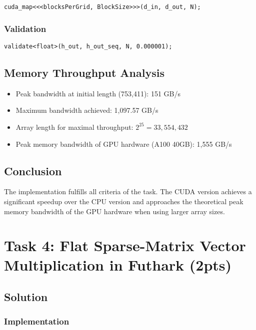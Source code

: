\documentclass{article}
\begin{document}
\begin{lstlisting}[language=cuda]
cuda_map<<<blocksPerGrid, BlockSize>>>(d_in, d_out, N);
\end{lstlisting}

\subsubsection{Validation}

\begin{lstlisting}[language=cuda]
validate<float>(h_out, h_out_seq, N, 0.000001);
\end{lstlisting}

\subsection{Memory Throughput Analysis}

\begin{itemize}
    \item Peak bandwidth at initial length (753,411): 151 GB/s
    \item Maximum bandwidth achieved: 1,097.57 GB/s
    \item Array length for maximal throughput: $2^{25} = 33,554,432$
    \item Peak memory bandwidth of GPU hardware (A100 40GB): 1,555 GB/s
\end{itemize}

\subsection{Conclusion}

The implementation fulfills all criteria of the task. The CUDA version achieves a significant speedup over the CPU version and approaches the theoretical peak memory bandwidth of the GPU hardware when using larger array sizes.

\section{Task 4: Flat Sparse-Matrix Vector Multiplication in Futhark (2pts)}


\subsection{Solution}

\subsubsection{Implementation}
\end{document}
